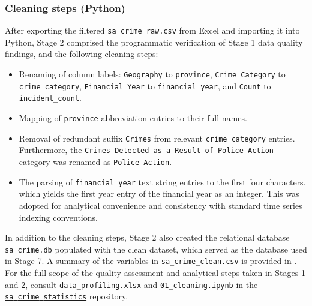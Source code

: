 \documentclass[titlepage, 12pt, oneside]{article}
\numberwithin{equation}{section}
\begin{document}
	\subsubsection*{Cleaning steps (Python)}
    After exporting the filtered \texttt{sa{\_}crime{\_}raw.csv} from Excel and importing it into Python, Stage 2 comprised the programmatic verification of Stage 1 data quality findings, and the following cleaning steps:
    \begin{itemize}[leftmargin=*]
    \item Renaming of column labels: \texttt{Geography} to \texttt{province}, \texttt{Crime Category} to \texttt{crime{\_}category}, \texttt{Financial Year} to \texttt{financial{\_}year}, and \texttt{Count} to \texttt{incident{\_}count}.   
    \item Mapping of \texttt{province} abbreviation entries to their full names.
    \item Removal of redundant suffix \texttt{Crimes} from relevant \texttt{crime{\_}category} entries. Furthermore, the \texttt{Crimes Detected as a Result of Police Action} category was renamed as \texttt{Police Action}.
    \item The parsing of \texttt{financial{\_}year} text string entries to the first four characters. which yields the first year entry of the financial year as an integer. This was adopted for analytical convenience and consistency with standard time series indexing conventions.
    \end{itemize}
    In addition to the cleaning steps, Stage 2 also created the relational database \texttt{sa{\_}crime.db} populated with the clean dataset, which served as the database used in Stage 7. A summary of the variables in \texttt{sa{\_}crime{\_}clean.csv} is provided in . For the full scope of the quality assessment and analytical steps taken in Stages 1 and 2, consult \texttt{data{\_}profiling.xlsx} and \texttt{01{\_}cleaning.ipynb} in the \href{https://github.com/joshua-pillay/sa-crime-statistics}{\texttt{sa{\_}crime{\_}statistics}} repository. 

    \vspace{\fill}
    
\end{document}
